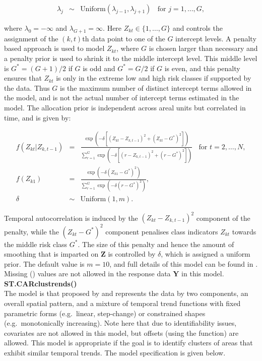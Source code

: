 \documentclass[article, nojss]{jss}
\begin{document}
\begin{eqnarray}
\lambda_{j}&\sim&\mbox{Uniform}(\lambda_{j-1},\lambda_{j+1})~~~~\mbox{for }j=1,\dots,G,\label{carcluster2}
\end{eqnarray}

where $\lambda_{0}=-\infty$ and  $\lambda_{G+1}=\infty$. Here $Z_{kt}\in\{1,\ldots,G\}$ and controls the assignment of the $(k,t)$th data point to one of the $G$ intercept levels. A penalty based approach is used to model $Z_{kt}$, where $G$ is chosen larger than necessary and a penalty prior is used  to shrink it to the middle intercept level.  This middle level is $G^{*}=(G+1)/2$ if $G$ is odd and $G^{*}=G/2$ if $G$ is even, and this penalty ensures that $Z_{kt}$ is only in the extreme low and high risk classes if supported by the data. Thus $G$ is the maximum number of distinct intercept terms allowed in the model, and is not the actual number of intercept terms estimated in the model. The allocation prior is independent across areal units but correlated in time, and is given by:


\begin{eqnarray}
f(Z_{kt}|Z_{k,t-1})&=&\frac{\exp(-\delta[(Z_{kt}-Z_{k,t-1})^{2} +(Z_{kt}-G^{*})^{2}])}{\sum_{r=1}^{G}\exp(-\delta[(r-Z_{k,t-1})^{2}+(r-G^{*})^{2}])}~~~~\mbox{for } t=2,\ldots,N,\label{carcluster3}\\
f(Z_{k1})&=&\frac{\exp(-\delta(Z_{k1}-G^{*})^{2})}{\sum_{r=1}^{G}\exp(-\delta(r-G^{*})^{2})},\nonumber\\
\delta&\sim&\mbox{Uniform}(1,m).\nonumber
\end{eqnarray}

Temporal autocorrelation is induced by the $(Z_{kt}-Z_{k,t-1})^{2}$ component of the penalty, while the $(Z_{kt}-G^{*})^{2}$ component penalises class indicators $Z_{kt}$ towards the middle risk class $G^{*}$. The size of this penalty and hence the amount of smoothing that is imparted on $\mathbf{Z}$ is controlled by $\delta$, which is assigned a uniform prior. The default value is $m=10$, and full details of this model can be found in \cite{lee2016}. Missing () values are not allowed in the response data $\mathbf{Y}$ in this model.\\

\textbf{ST.CARclustrends()}\\
The model is that proposed by \cite{napier2018} and represents the data by two components, an overall spatial pattern, and  a mixture of temporal trend functions with fixed parametric forms (e.g.\ linear, step-change) or constrained shapes (e.g.\ monotonically increasing). Note here that due to identifiability issues, covariates are not allowed in this model, but offsets (using the  function) are allowed. This model is appropriate if the goal is to identify clusters of areas that exhibit similar temporal trends. The model specification is given below.
\end{document}
